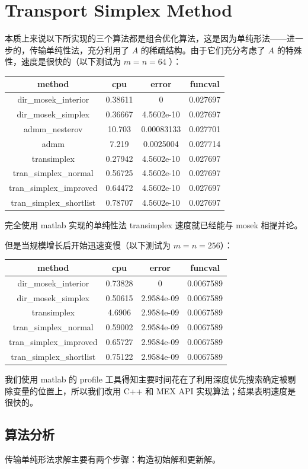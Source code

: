 \documentclass[]{article}
\begin{document}
\section{Transport Simplex Method}

本质上来说以下所实现的三个算法都是组合优化算法，这是因为单纯形法------进一步的，传输单纯性法，充分利用了
\(A\) 的稀疏结构。由于它们充分考虑了 \(A\)
的特殊性，速度是很快的（以下测试为 \(m=n=64\) ）：

\begin{longtable}[]{@{}c|ccc@{}}
\hline
method & cpu & error & funcval\tabularnewline
\hline
dir\_mosek\_interior & 0.38611 & 0 & 0.027697\tabularnewline
dir\_mosek\_simplex & 0.36667 & 4.5602e-10 & 0.027697\tabularnewline
admm\_nesterov & 10.703 & 0.00083133 & 0.027701\tabularnewline
admm & 7.219 & 0.0025004 & 0.027714\tabularnewline
transimplex & 0.27942 & 4.5602e-10 & 0.027697\tabularnewline
tran\_simplex\_normal & 0.56725 & 4.5602e-10 & 0.027697\tabularnewline
tran\_simplex\_improved & 0.64472 & 4.5602e-10 & 0.027697\tabularnewline
tran\_simplex\_shortlist & 0.78707 & 4.5602e-10 &
0.027697\tabularnewline
\hline
\end{longtable}

完全使用 matlab 实现的单纯性法 transimplex 速度就已经能与 mosek
相提并论。

但是当规模增长后开始迅速变慢（以下测试为 \(m=n=256\)）：

\begin{longtable}[]{@{}c|ccc@{}}
\hline
method & cpu & error & funcval\tabularnewline

\hline
dir\_mosek\_interior & 0.73828 & 0 & 0.0067589\tabularnewline
dir\_mosek\_simplex & 0.50615 & 2.9584e-09 & 0.0067589\tabularnewline
transimplex & 4.6906 & 2.9584e-09 & 0.0067589\tabularnewline
tran\_simplex\_normal & 0.59002 & 2.9584e-09 & 0.0067589\tabularnewline
tran\_simplex\_improved & 0.65727 & 2.9584e-09 &
0.0067589\tabularnewline
tran\_simplex\_shortlist & 0.75122 & 2.9584e-09 &
0.0067589\tabularnewline
\hline
\end{longtable}

我们使用 matlab 的 profile
工具得知主要时间花在了利用深度优先搜索确定被剔除变量的位置上，所以我们改用
C++ 和 MEX API 实现算法；结果表明速度是很快的。

\subsection{算法分析}

传输单纯形法求解主要有两个步骤：构造初始解和更新解。
\end{document}
